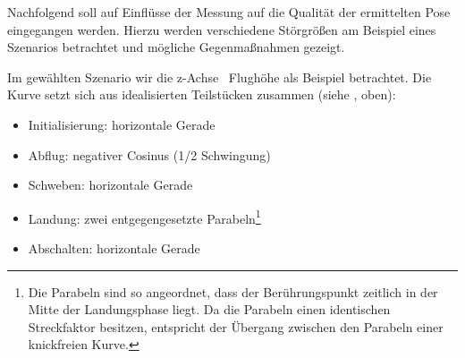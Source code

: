 











Nachfolgend soll auf Einflüsse der Messung auf die Qualität der ermittelten Pose eingegangen werden. Hierzu werden verschiedene Störgrößen am Beispiel eines Szenarios betrachtet und mögliche Gegenmaßnahmen gezeigt.





Im gewählten Szenario wir die z-Achse \bzw\ Flughöhe als Beispiel betrachtet. 
Die Kurve setzt sich aus idealisierten Teilstücken zusammen (siehe , oben):
\begin{itemize}
\item Initialisierung: horizontale Gerade
\item Abflug: negativer Cosinus (1/2 Schwingung)
\item Schweben: horizontale Gerade
\item Landung: zwei entgegengesetzte Parabeln\footnote{Die Parabeln sind so angeordnet, dass der Berührungspunkt zeitlich in der Mitte der Landungsphase liegt. Da die Parabeln einen identischen Streckfaktor besitzen, entspricht der Übergang zwischen den Parabeln einer knickfreien Kurve.}
\item Abschalten: horizontale Gerade
\end{itemize}


